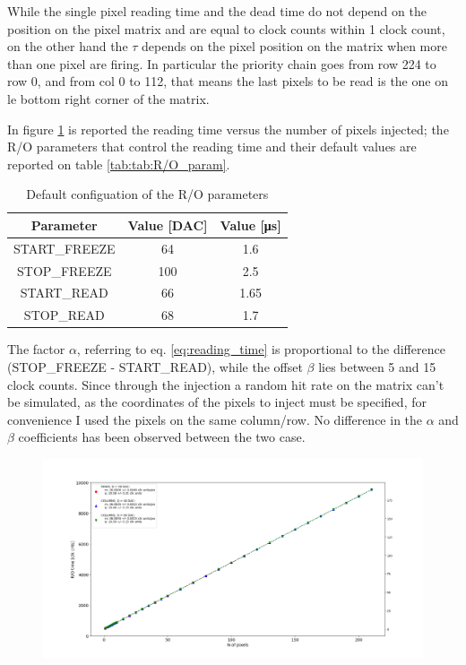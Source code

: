         While the single pixel reading time and the dead time do not depend on the position on the pixel matrix and are equal to  clock counts within 1 clock count, on the other hand the $\tau$ depends on the pixel position on the matrix when more than one pixel are firing. 
        In particular the priority chain goes from row 224 to row 0, and from col 0 to 112, that means the last pixels to be read is the one on le bottom right corner of the matrix. 

        In figure \ref{fig:dead_time} is reported the reading time versus the number of pixels injected; the R/O parameters that control the reading time and their default values are reported on table \ref{tab:tab:R/O_param}.
        \begin{table}
            \begin{center}
            \begin{tabular}{|c | c | c |}
            \hline
            Parameter & Value [\si{DAC}] & Value [\si{\us}]\\
            \hline
            \hline
            START\_FREEZE & 64 & 1.6\\
            STOP\_FREEZE & 100 & 2.5\\
            START\_READ & 66 & 1.65\\
            STOP\_READ & 68 & 1.7\\
            \hline
            \end{tabular}
            \caption{Default configuation of the R/O parameters}
            \label{tab:R/O_param}
            \end{center}
        \end{table}

        The factor $\alpha$, referring to eq. \ref{eq:reading_time} is proportional to the difference (STOP\_FREEZE - START\_READ), while the offset $\beta$ lies between 5 and 15 clock counts.
        Since through the injection a random hit rate on the matrix can't be simulated, as the coordinates of the pixels to inject must be specified, for convenience I used the pixels on the same column/row. No difference in the $\alpha$ and $\beta$ coefficients has been observed between the two case. 
        \begin{figure}[h!]
            \centering
            \includegraphics[width=.9\linewidth]{figures/charaterization/default_line.png}
            \caption{}
            \label{fig:dead_time}
        \end{figure}

